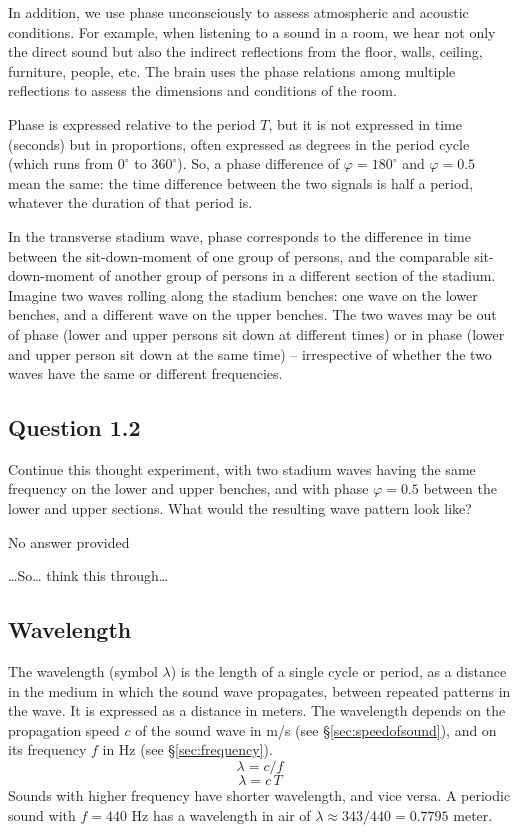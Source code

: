 \documentclass[
]{book}
\begin{document}
In addition, we use phase unconsciously to assess atmospheric and acoustic conditions. For example, when listening to a sound in a room, we hear not only the direct sound but also the indirect reflections from the floor, walls, ceiling, furniture, people, etc. The brain uses the phase relations among multiple reflections to assess the dimensions and conditions of the room.

Phase is expressed relative to the period \(T\), but it is not expressed in time (seconds) but in proportions, often expressed as degrees in the period cycle (which runs from \(0^\circ\) to \(360^\circ\)). So, a phase difference of \(\varphi=180^\circ\) and \(\varphi=0.5\) mean the same: the time difference between the two signals is half a period, whatever the duration of that period is.

In the transverse stadium wave, phase corresponds to the difference in time between the sit-down-moment of one group of persons, and the comparable sit-down-moment of another group of persons in a different section of the stadium. Imagine two waves rolling along the stadium benches: one wave on the lower benches, and a different wave on the upper benches. The two waves may be out of phase (lower and upper persons sit down at different times) or in phase (lower and upper person sit down at the same time) -- irrespective of whether the two waves have the same or different frequencies.

\label{questions-phase}
\subsection*{Question 1.2}\label{question-1.2}

Continue this thought experiment, with two stadium waves having the same frequency on the lower and upper benches, and with phase \(\varphi=0.5\) between the lower and upper sections. What would the resulting wave pattern look like?

No answer provided

\ldots So\ldots{} think this through\ldots{}

\subsection{Wavelength}\label{sec:wavelength}

The wavelength (symbol \(\lambda\)) is the length of a single cycle or period, as a distance in the medium in which the sound wave propagates, between repeated patterns in the wave. It is expressed as a distance in meters. The wavelength depends on the propagation speed \(c\) of the sound wave in m/s (see §\ref{sec:speedofsound}), and on its frequency \(f\) in Hz (see §\ref{sec:frequency}).
\[\lambda = c / f\]
\[\lambda = c \, T\]
Sounds with higher frequency have shorter wavelength, and vice versa. A periodic sound with \(f=440\) Hz has a wavelength in air of \(\lambda \approx 343/440 = 0.7795\) meter.
\end{document}
